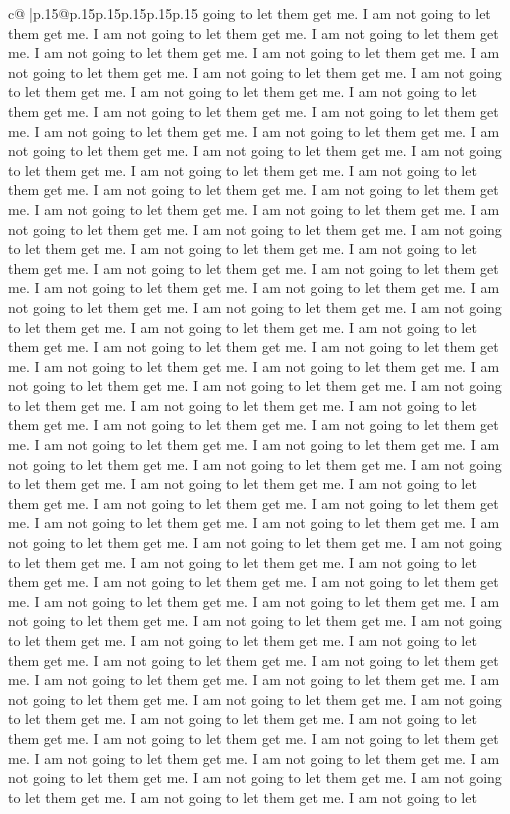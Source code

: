 \documentclass{article}
\begin{document}
{\begin{supertabular}{c@{$\;$}|p{.15\linewidth}@{}p{.15\linewidth}p{.15\linewidth}p{.15\linewidth}p{.15\linewidth}p{.15\linewidth}}
{{{going to let them get me. I am not going to let them get me. I am not going to let them get me. I am not going to let them get me. I am not going to let them get me. I am not going to let them get me. I am not going to let them get me. I am not going to let them get me. I am not going to let them get me. I am not going to let them get me. I am not going to let them get me. I am not going to let them get me. I am not going to let them get me. I am not going to let them get me. I am not going to let them get me. I am not going to let them get me. I am not going to let them get me. I am not going to let them get me. I am not going to let them get me. I am not going to let them get me. I am not going to let them get me. I am not going to let them get me. I am not going to let them get me. I am not going to let them get me. I am not going to let them get me. I am not going to let them get me. I am not going to let them get me. I am not going to let them get me. I am not going to let them get me. I am not going to let them get me. I am not going to let them get me. I am not going to let them get me. I am not going to let them get me. I am not going to let them get me. I am not going to let them get me. I am not going to let them get me. I am not going to let them get me. I am not going to let them get me. I am not going to let them get me. I am not going to let them get me. I am not going to let them get me. I am not going to let them get me. I am not going to let them get me. I am not going to let them get me. I am not going to let them get me. I am not going to let them get me. I am not going to let them get me. I am not going to let them get me. I am not going to let them get me. I am not going to let them get me. I am not going to let them get me. I am not going to let them get me. I am not going to let them get me. I am not going to let them get me. I am not going to let them get me. I am not going to let them get me. I am not going to let them get me. I am not going to let them get me. I am not going to let them get me. I am not going to let them get me. I am not going to let them get me. I am not going to let them get me. I am not going to let them get me. I am not going to let them get me. I am not going to let them get me. I am not going to let them get me. I am not going to let them get me. I am not going to let them get me. I am not going to let them get me. I am not going to let them get me. I am not going to let them get me. I am not going to let them get me. I am not going to let them get me. I am not going to let them get me. I am not going to let them get me. I am not going to let them get me. I am not going to let them get me. I am not going to let them get me. I am not going to let them get me. I am not going to let them get me. I am not going to let them get me. I am not going to let them get me. I am not going to let them get me. I am not going to let them get me. I am not going to let them get me. I am not going to let them get me. I am not going to let them get me. I am not going to let them get me. I am not going to let them get me. I am not going to let them get me. I am not going to let them get me. I am not going to let }}}
\end{supertabular}}
\end{document}
